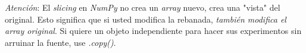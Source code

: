 \begin{nota}
    \textit{Atención}: El \textit{slicing} en \textit{NumPy} no crea un \textit{array} nuevo, crea una "vista" del original. Esto significa que si usted modifica la rebanada, \textit{también modifica el array original}. Si quiere un objeto independiente para hacer sus experimentos sin arruinar la fuente, use \textit{.copy()}.
\end{nota}